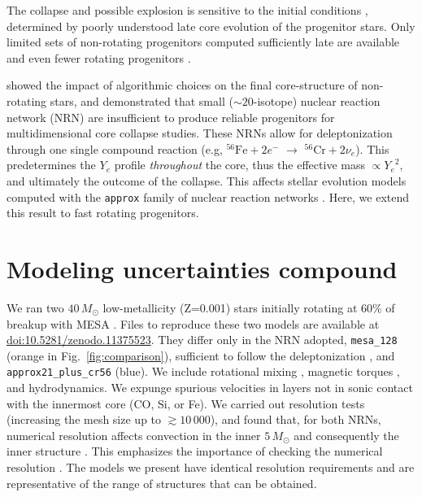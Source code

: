 \documentclass[twocolumn]{aastex63}
\DeclareRobustCommand{\Figref}[1]{Fig.~\ref{#1}}
\begin{document}
The collapse and possible explosion is sensitive to the initial
conditions \citep[e.g.,][]{ott:18, kuroda:18, burrows:23,
  nakamura:24}, determined by poorly understood late core evolution of
the progenitor stars. Only limited sets of non-rotating progenitors
computed sufficiently late are available \citep{woosley:02,
  sukhbold:16, farmer:16, renzo:17, wang:24} and even fewer rotating
progenitors \citep{heger:00, aguilera-dena:18}. %

\cite{farmer:16} showed the impact of algorithmic choices on the final
core-structure of non-rotating stars, and demonstrated that small
($\sim{}20$-isotope) nuclear reaction network (NRN) are insufficient
to produce reliable progenitors for multidimensional core collapse
studies. These NRNs allow for deleptonization through one single
compound reaction (e.g, $^{56}\mathrm{Fe}+2e^{-}$ $\rightarrow$
$^{56}\mathrm{Cr}+2\nu_{e}$). This predetermines the $Y_e$ profile
\emph{throughout} the core, thus the effective \cite{chandrasekhar:31}
mass $\propto {Y_e}^2$, and ultimately the outcome of the collapse.
This affects stellar evolution models computed with the
\texttt{approx} family of nuclear reaction networks \citep{timmes:00}.
Here, we extend this result to fast rotating progenitors.

\section{Modeling uncertainties compound}

We ran two $40\,M_\odot$ low-metallicity (Z=0.001) stars initially
rotating at 60\% of breakup with MESA \citep[][version
r24.03.1]{paxton:11, paxton:13, paxton:15, paxton:18, paxton:19,
  jermyn:23}. Files to reproduce these two models are available at
\href{https://doi.org/10.5281/zenodo.11375523}{doi:10.5281/zenodo.11375523}.
They differ only in the NRN adopted, \texttt{mesa\_128} (orange in
\Figref{fig:comparison}), sufficient to follow the deleptonization
\citep{farmer:16}, and \texttt{approx21\_plus\_cr56} (blue). We
include rotational mixing \citep{heger:00}, magnetic torques
\citep{spruit:02}, and %
hydrodynamics. We expunge spurious velocities in layers not in sonic
contact with the innermost core (CO, Si, or Fe). We carried out
resolution tests (increasing the mesh size up to $\gtrsim 10\,000$),
and found that, for both NRNs, numerical resolution affects convection
in the inner $5\,M_\odot$ and consequently the inner structure
\citep[e.g.,][]{sukhbold:14, schneider:23}. This emphasizes the
importance of checking the numerical resolution \citep{farmer:16,
  farag:22}. The models we present have identical resolution
requirements and are representative of the range of structures that
can be obtained.
\end{document}

